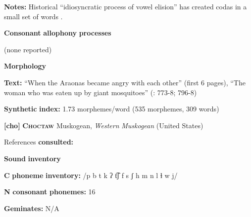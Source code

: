 \begin{styleBody}
\textbf{Notes:} Historical “idiosyncratic process of vowel elision” has created codas in a small set of words \citep[29]{Guillaume2008}.
\end{styleBody}

\begin{styleBody}
\textbf{Consonant} \textbf{allophony} \textbf{processes}
\end{styleBody}

\begin{styleBody}
(none reported)
\end{styleBody}

\begin{styleBody}
\textbf{Morphology}
\end{styleBody}

\begin{styleBody}
\textbf{Text:} “When the Araonas became angry with each other” (first 6 pages), “The woman who was eaten up by giant mosquitoes” (\citealt{Guillaume2008}: 773-8; 796-8)
\end{styleBody}

\begin{styleBody}
\textbf{Synthetic} \textbf{index:} 1.73 morphemes/word (535 morphemes, 309 words)
\end{styleBody}

\begin{styleBody}
\textbf{[cho]}   \textbf{\textsc{Choctaw}}  Muskogean, \textit{Western} \textit{Muskogean} (United States)
\end{styleBody}

\begin{styleBody}
References \textbf{consulted:} \citet{Broadwell2006}
\end{styleBody}

\begin{styleBody}
\textbf{Sound} \textbf{inventory}
\end{styleBody}

\begin{styleBody}
\textbf{C} \textbf{phoneme} \textbf{inventory:} /p b t k ʔ t͡ʃ f s ʃ h m n l ɬ w j/
\end{styleBody}

\begin{styleBody}
\textbf{N} \textbf{consonant} \textbf{phonemes:} 16
\end{styleBody}

\begin{styleBody}
\textbf{Geminates:} N/A
\end{styleBody}


